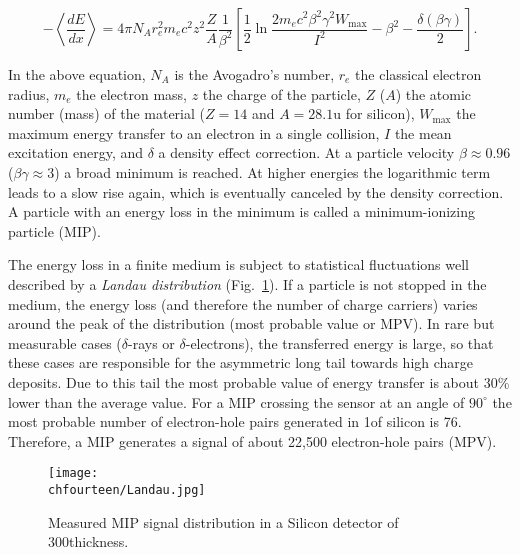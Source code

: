 \begin{equation}
- \left\langle\frac{dE}{dx}\right\rangle = 4\pi N_Ar_e^2m_ec^2 z^2\frac{Z}{A}\frac{1}{\beta^2}\left[ \frac{1}{2}\ln\frac{2m_ec^2\beta^2\gamma^2W_\mathrm{max}}{I^2} - \beta^2 - \frac{\delta(\beta\gamma)}{2}\right].
\end{equation}

In the above equation, $N_A$ is the Avogadro's number, 
$r_e$ the classical electron radius,
$m_e$ the electron mass,
$z$ the charge of the particle,
$Z$ ($A$) the atomic number (mass) of the material ($Z = 14$ and $A = 28.1$\unit{u} for silicon),
$W_\mathrm{max}$ the maximum energy transfer to an electron in a single collision,
$I$ the mean excitation energy,
and $\delta$ a density effect correction.
At a particle velocity $\beta \approx 0.96$ ($\beta\gamma \approx 3$) a broad minimum is reached. At higher energies the logarithmic term leads to a slow rise again, which is eventually canceled by the density correction. A particle with an energy loss in the minimum is called a minimum-ionizing particle (MIP).

The energy loss in a finite medium is subject to statistical fluctuations well described by a \textit{Landau distribution} (Fig.~\ref{fig:Landau}).
If a particle is not stopped in the medium, the energy loss (and therefore the number of charge carriers) varies around the peak of the distribution (most probable value or MPV).
In rare but measurable cases ($\delta$-rays or $\delta$-electrons), the transferred energy is large, so that these cases are responsible for the asymmetric long tail towards high charge deposits.
Due to this tail the most probable value of energy transfer is about 30\% lower than the average value.
For a MIP crossing the sensor at an angle of $90^\circ$ the most probable number of electron-hole pairs generated in 1\mum of silicon is 76.
Therefore, a MIP generates a signal of about 22,500 electron-hole pairs (MPV).\\

\begin{figure}[!htb]
 \begin{center}
 \texttt{[image: \\chfourteen/Landau.jpg]}
 \end{center}
 \caption{Measured MIP signal distribution in a Silicon detector of 300\mum thickness.}
 \label{fig:Landau}
\end{figure}

